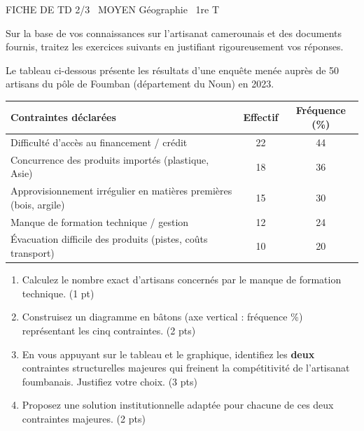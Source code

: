\documentclass[11pt]{article}
\begin{document}
\begin{tcolorbox}[enhanced,colback=popink,colframe=popink,arc=10pt,boxrule=0pt,left=12pt,right=12pt,top=9pt,bottom=9pt]
{\color{white}\popxbold\small FICHE DE TD 2/3 \textbullet\ MOYEN \hfill Géographie \textbullet\ 1re T\par}
\end{tcolorbox}
\vspace{4pt}
\noindent Sur la base de vos connaissances sur l'artisanat camerounais et des documents fournis, traitez les exercices suivants en justifiant rigoureusement vos réponses.

\begin{exercice}
Le tableau ci-dessous présente les résultats d'une enquête menée auprès de 50 artisans du pôle de Foumban (département du Noun) en 2023.

\begin{center}
\begin{tabular}{|l|c|c|}
\hline
\textbf{Contraintes déclarées} & \textbf{Effectif} & \textbf{Fréquence (\%)} \\
\hline
Difficulté d'accès au financement / crédit & 22 & 44 \\
Concurrence des produits importés (plastique, Asie) & 18 & 36 \\
Approvisionnement irrégulier en matières premières (bois, argile) & 15 & 30 \\
Manque de formation technique / gestion & 12 & 24 \\
Évacuation difficile des produits (pistes, coûts transport) & 10 & 20 \\
\hline
\end{tabular}
\end{center}

\begin{enumerate}
\item Calculez le nombre exact d'artisans concernés par le manque de formation technique. \hfill (1 pt)
\item Construisez un diagramme en bâtons (axe vertical : fréquence \%) représentant les cinq contraintes. \hfill (2 pts)
\item En vous appuyant sur le tableau et le graphique, identifiez les \textbf{deux} contraintes structurelles majeures qui freinent la compétitivité de l'artisanat foumbanais. Justifiez votre choix. \hfill (3 pts)
\item Proposez une solution institutionnelle adaptée pour chacune de ces deux contraintes majeures. \hfill (2 pts)
\end{enumerate}
\end{exercice}
\end{document}

